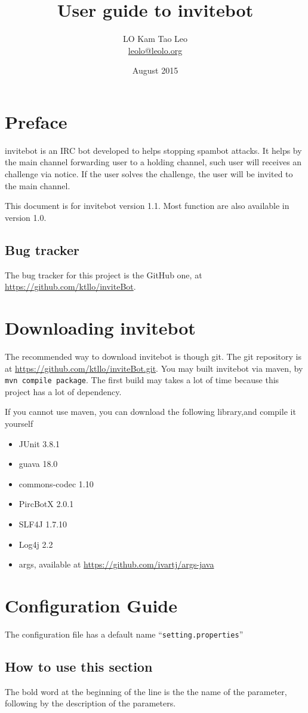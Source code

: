 \documentclass[a4paper,12pt,titlepage]{article}
\title{User guide to invitebot}
\author{LO Kam Tao Leo\\\href{mailto:leolo@leolo.org}{leolo@leolo.org}}
\date{August 2015}
\begin{document}
	\maketitle
\tableofcontents\newpage
\section{Preface}
invitebot is an IRC bot developed to helps stopping spambot attacks. It helps by the main channel forwarding user to a holding channel, such user will receives an challenge via notice. If the user solves the challenge, the user will be invited to the main channel.

This document is for invitebot version 1.1. Most function are also available in version 1.0.
\subsection{Bug tracker}
The bug tracker for this project is the GitHub one, at \url{https://github.com/ktllo/inviteBot}.
\section{Downloading invitebot}
The recommended way to download invitebot is though git. The git repository is at \url{https://github.com/ktllo/inviteBot.git}. You may built invitebot via maven, by \texttt{mvn compile package}. The first build may takes a lot of time because this project has a lot of dependency.

If you cannot use maven, you can download the following library,and compile it yourself
\begin{itemize}
	\item JUnit 3.8.1
	\item guava 18.0
	\item commons-codec 1.10
	\item PircBotX 2.0.1
	\item SLF4J 1.7.10
	\item Log4j 2.2
	\item args, available at \url{https://github.com/ivartj/args-java}
\end{itemize}
\section{Configuration Guide}
The configuration file has a default name ``\texttt{setting.properties}''
\subsection{How to use this section}
The bold word at the beginning of the line is the the name of the parameter, following by the description of the parameters.
\end{document}

